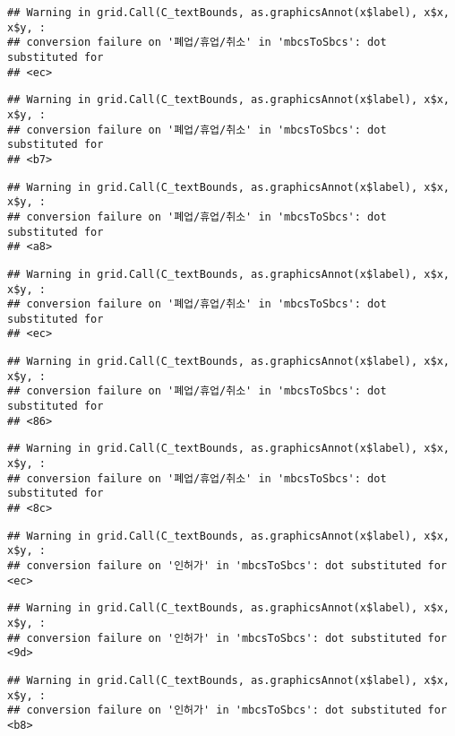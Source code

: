 \documentclass[
]{book}
\begin{document}
\begin{verbatim}
## Warning in grid.Call(C_textBounds, as.graphicsAnnot(x$label), x$x, x$y, :
## conversion failure on '폐업/휴업/취소' in 'mbcsToSbcs': dot substituted for
## <ec>
\end{verbatim}

\begin{verbatim}
## Warning in grid.Call(C_textBounds, as.graphicsAnnot(x$label), x$x, x$y, :
## conversion failure on '폐업/휴업/취소' in 'mbcsToSbcs': dot substituted for
## <b7>
\end{verbatim}

\begin{verbatim}
## Warning in grid.Call(C_textBounds, as.graphicsAnnot(x$label), x$x, x$y, :
## conversion failure on '폐업/휴업/취소' in 'mbcsToSbcs': dot substituted for
## <a8>
\end{verbatim}

\begin{verbatim}
## Warning in grid.Call(C_textBounds, as.graphicsAnnot(x$label), x$x, x$y, :
## conversion failure on '폐업/휴업/취소' in 'mbcsToSbcs': dot substituted for
## <ec>
\end{verbatim}

\begin{verbatim}
## Warning in grid.Call(C_textBounds, as.graphicsAnnot(x$label), x$x, x$y, :
## conversion failure on '폐업/휴업/취소' in 'mbcsToSbcs': dot substituted for
## <86>
\end{verbatim}

\begin{verbatim}
## Warning in grid.Call(C_textBounds, as.graphicsAnnot(x$label), x$x, x$y, :
## conversion failure on '폐업/휴업/취소' in 'mbcsToSbcs': dot substituted for
## <8c>
\end{verbatim}

\begin{verbatim}
## Warning in grid.Call(C_textBounds, as.graphicsAnnot(x$label), x$x, x$y, :
## conversion failure on '인허가' in 'mbcsToSbcs': dot substituted for <ec>
\end{verbatim}

\begin{verbatim}
## Warning in grid.Call(C_textBounds, as.graphicsAnnot(x$label), x$x, x$y, :
## conversion failure on '인허가' in 'mbcsToSbcs': dot substituted for <9d>
\end{verbatim}

\begin{verbatim}
## Warning in grid.Call(C_textBounds, as.graphicsAnnot(x$label), x$x, x$y, :
## conversion failure on '인허가' in 'mbcsToSbcs': dot substituted for <b8>
\end{verbatim}
\end{document}
